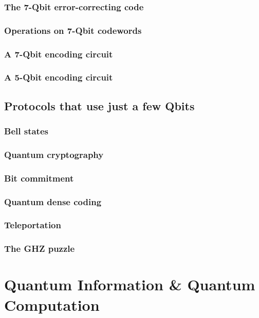 \documentclass{book}
\theoremstyle{definition}
\begin{document}
\subsection{The 7-Qbit error-correcting code}
\subsection{Operations on 7-Qbit codewords}
\subsection{A 7-Qbit encoding circuit}
\subsection{A 5-Qbit encoding circuit}

\newpage

\section{Protocols that use just a few Qbits}

\subsection{Bell states}
\subsection{Quantum cryptography}
\subsection{Bit commitment}
\subsection{Quantum dense coding}
\subsection{Teleportation}
\subsection{The GHZ puzzle}











\chapter{Quantum Information \& Quantum Computation}
\newpage
\end{document}
